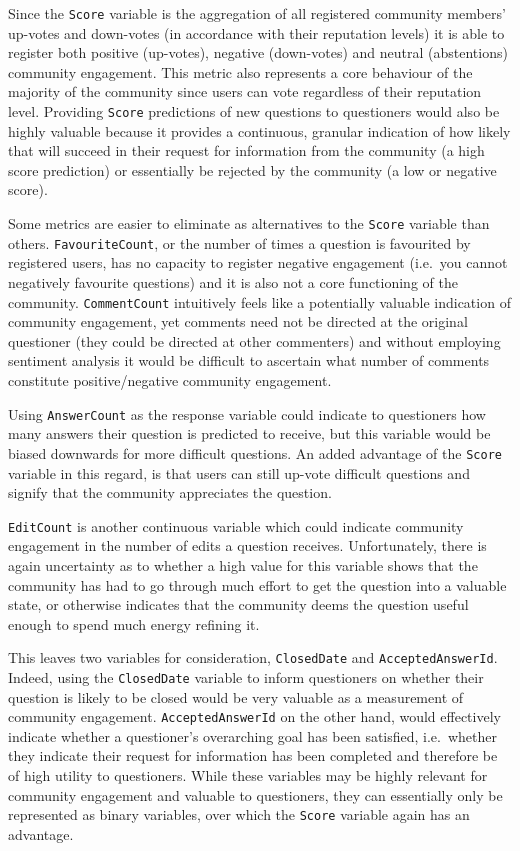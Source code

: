 \documentclass[11pt,preprint, authoryear]{article}
\begin{document}

Since the \texttt{Score} variable is the aggregation of all registered
community members' up-votes and down-votes (in accordance with their
reputation levels) it is able to register both positive (up-votes),
negative (down-votes) and neutral (abstentions) community engagement.
This metric also represents a core behaviour of the majority of the
community since users can vote regardless of their reputation level.
Providing \texttt{Score} predictions of new questions to questioners
would also be highly valuable because it provides a continuous, granular
indication of how likely that will succeed in their request for
information from the community (a high score prediction) or essentially
be rejected by the community (a low or negative score).

Some metrics are easier to eliminate as alternatives to the
\texttt{Score} variable than others. \texttt{FavouriteCount}, or the
number of times a question is favourited by registered users, has no
capacity to register negative engagement (i.e.~you cannot negatively
favourite questions) and it is also not a core functioning of the
community. \texttt{CommentCount} intuitively feels like a potentially
valuable indication of community engagement, yet comments need not be
directed at the original questioner (they could be directed at other
commenters) and without employing sentiment analysis it would be
difficult to ascertain what number of comments constitute
positive/negative community engagement.

Using \texttt{AnswerCount} as the response variable could indicate to
questioners how many answers their question is predicted to receive, but
this variable would be biased downwards for more difficult questions. An
added advantage of the \texttt{Score} variable in this regard, is that
users can still up-vote difficult questions and signify that the
community appreciates the question.

\texttt{EditCount} is another continuous variable which could indicate
community engagement in the number of edits a question receives.
Unfortunately, there is again uncertainty as to whether a high value for
this variable shows that the community has had to go through much effort
to get the question into a valuable state, or otherwise indicates that
the community deems the question useful enough to spend much energy
refining it.

This leaves two variables for consideration, \texttt{ClosedDate} and
\texttt{AcceptedAnswerId}. Indeed, using the \texttt{ClosedDate}
variable to inform questioners on whether their question is likely to be
closed would be very valuable as a measurement of community engagement.
\texttt{AcceptedAnswerId} on the other hand, would effectively indicate
whether a questioner's overarching goal has been satisfied, i.e.~whether
they indicate their request for information has been completed and
therefore be of high utility to questioners. While these variables may
be highly relevant for community engagement and valuable to questioners,
they can essentially only be represented as binary variables, over which
the \texttt{Score} variable again has an advantage.
\end{document}
